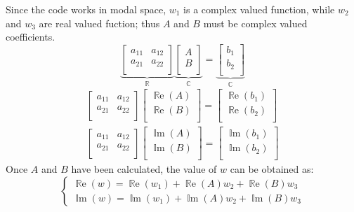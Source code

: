 Since the code works in modal space, $w_1$ is a complex valued function, while $w_2$ and $w_3$ are real valued fuction; thus $A$ and $B$ must be complex valued coefficients.
\[
\underbrace{
\begin{bmatrix}
a_{11} & a_{12}\\
a_{21} & a_{22}\\
\end{bmatrix}
}_\text{$\mathbb{R}$}
\underbrace{
\begin{bmatrix}
A\\
B\\
\end{bmatrix}
}_\text{$\mathbb{C}$}
=
\underbrace{
\begin{bmatrix}
b_1\\
b_2\\
\end{bmatrix}
}_\text{$\mathbb{C}$}
\]
\begin{equation}
\begin{array}{l}
\begin{bmatrix}
a_{11} & a_{12}\\
a_{21} & a_{22}\\
\end{bmatrix}
\begin{bmatrix}
\operatorname{\mathbb{R}e}(A) \\
\operatorname{\mathbb{R}e}(B) \\
\end{bmatrix}
=
\begin{bmatrix}
\operatorname{\mathbb{R}e}(b_1)\\
\operatorname{\mathbb{R}e}(b_2)\\
\end{bmatrix}
\\[5ex]
\begin{bmatrix}
a_{11} & a_{12}\\
a_{21} & a_{22}\\
\end{bmatrix}
\begin{bmatrix}
\operatorname{\mathbb{I}m}(A)\\
\operatorname{\mathbb{I}m}(B)\\
\end{bmatrix}
=
\begin{bmatrix}
\operatorname{\mathbb{I}m}(b_1)\\
\operatorname{\mathbb{I}m}(b_2)\\
\end{bmatrix}
\end{array}
\end{equation}
Once $A$ and $B$ have been calculated, the value of $w$ can be obtained as:
\begin{equation}
\begin{cases}
\operatorname{\mathbb{R}e}(w)=\operatorname{\mathbb{R}e}(w_1)+\operatorname{\mathbb{R}e}(A)w_2+\operatorname{\mathbb{R}e}(B) w_3\\
\operatorname{\mathbb{I}m}(w)=\operatorname{\mathbb{I}m}(w_1)+\operatorname{\mathbb{I}m}(A)w_2+\operatorname{\mathbb{I}m}(B) w_3
\end{cases}
\end{equation}

